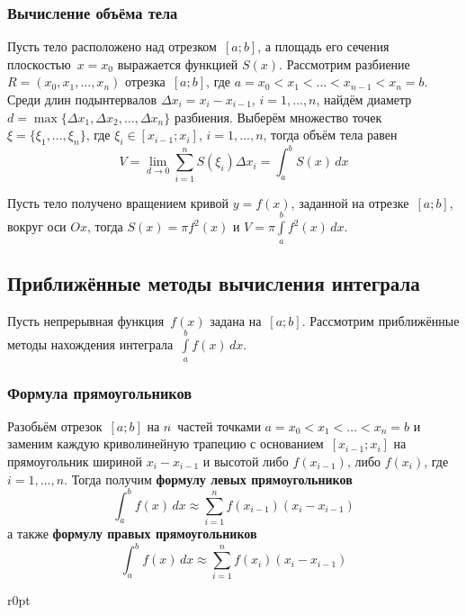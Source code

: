 \subsubsection{Вычисление объёма тела}
Пусть тело расположено над отрезком~$[a; b]$, а площадь его сечения плоскостью~$x = x_0$ выражается функцией $S(x)$.
Рассмотрим разбиение~$R = (x_0, x_1, \ldots, x_n)$ отрезка~$[a; b]$, где $a = x_0 < x_1 < \ldots < x_{n-1} < x_n = b$.
Среди длин подынтервалов $\Delta x_i = x_i - x_{i-1}$, $i = 1, \ldots, n$, найдём диаметр $d = \max \{ \Delta x_1, \Delta x_2, \ldots, \Delta x_n \}$ разбиения.
Выберём множество точек $\xi = \{ \xi_1, \ldots, \xi_n \}$, где $\xi_i \in [x_{i-1}; x_i]$, $i = 1, \ldots, n$, тогда объём тела равен
\begin{equation*}
V = \lim_{d \to 0} \sum_{i=1}^n S(\xi_i) \Delta x_i =
\int_a^b S(x)\,dx
\end{equation*}

Пусть тело получено вращением кривой $y = f(x)$, заданной на отрезке~$[a; b]$, вокруг оси $Ox$, тогда $S(x) = \pi f^2(x)$ и $V = \pi \int\limits_a^b f^2(x)\,dx$.

\subsection{Приближённые методы вычисления интеграла}
Пусть непрерывная функция~$f(x)$ задана на~$[a; b]$.
Рассмотрим приближённые методы нахождения интеграла~$\int\limits_a^b f(x)\,dx$.

\subsubsection{Формула прямоугольников}
 Разобьём отрезок~$[a; b]$ на $n$~частей точками $a = x_0 < x_1 < \ldots < x_n = b$ и заменим каждую криволинейную трапецию с основанием~$[x_{i-1}; x_i]$ на прямоугольник шириной $x_i - x_{i-1}$ и высотой либо $f(x_{i-1})$, либо $f(x_i)$, где $i = 1, \ldots, n$.
Тогда получим \textbf{формулу левых прямоугольников}
\begin{equation*}
\int_a^b f(x)\,dx \approx \sum_{i=1}^n f(x_{i-1}) (x_i - x_{i-1})
\end{equation*}
а также \textbf{формулу правых прямоугольников}
\begin{equation*}
\int_a^b f(x)\,dx \approx \sum_{i=1}^n f(x_i) (x_i - x_{i-1})
\end{equation*}
\begin{wrapfigure}{r}{0pt}\noindent
{}
\end{wrapfigure}

